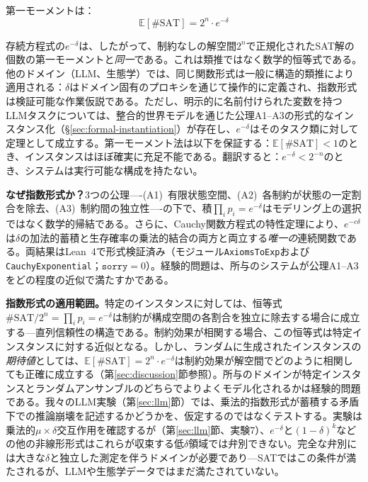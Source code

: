 \documentclass[11pt,a4paper]{article}
\begin{document}
第一モーメントは：
\begin{equation}
\mathbb{E}[\#\text{SAT}] = 2^n \cdot e^{-\delta}
\label{eq:first-moment-exp}
\end{equation}

存続方程式の$e^{-\delta}$は、したがって、制約なしの解空間$2^n$で正規化されたSAT解の個数の第一モーメントと\emph{同一}である。これは類推ではなく数学的恒等式である。他のドメイン（LLM、生態学）では、同じ関数形式は一般に構造的類推により適用される：$\delta$はドメイン固有のプロキシを通じて操作的に定義され、指数形式は検証可能な作業仮説である。ただし、明示的に名前付けられた変数を持つLLMタスクについては、整合的世界モデルを通じた公理A1--A3の形式的なインスタンス化（\S\ref{sec:formal-instantiation}）が存在し、$e^{-\delta}$はそのタスク類に対して定理として成立する。第一モーメント法\cite{alon2016}は以下を保証する：$\mathbb{E}[\#\text{SAT}] < 1$のとき、インスタンスはほぼ確実に充足不能である。翻訳すると：$e^{-\delta} < 2^{-n}$のとき、システムは実行可能な構成を持たない。

\textbf{なぜ指数形式か？}3つの公理----(A1)~有限状態空間、(A2)~各制約が状態の一定割合を除去、(A3)~制約間の独立性----の下で、積$\prod_i p_i = e^{-\delta}$はモデリング上の選択ではなく数学的帰結である。さらに、Cauchy関数方程式の特性定理により、$e^{-c\delta}$は$\delta$の加法的蓄積と生存確率の乗法的結合の両方と両立する\emph{唯一の}連続関数である\cite{aczel1966}。両結果はLean~4で形式検証済み（モジュール\texttt{AxiomsToExp}および\texttt{CauchyExponential}；$\texttt{sorry} = 0$）。経験的問題は、所与のシステムが公理A1--A3をどの程度の近似で満たすかである。

\textbf{指数形式の適用範囲。}特定のインスタンスに対しては、恒等式$\#\text{SAT}/2^n = \prod_i p_i = e^{-\delta}$は制約が構成空間の各割合を独立に除去する場合に成立する---直列信頼性\cite{barlow1975}の構造である。制約効果が相関する場合、この恒等式は特定インスタンスに対する近似となる。しかし、ランダムに生成されたインスタンスの\emph{期待値}としては、$\mathbb{E}[\#\text{SAT}] = 2^n \cdot e^{-\delta}$は制約効果が解空間でどのように相関しても正確に成立する（第\ref{sec:discussion}節参照）。所与のドメインが特定インスタンスとランダムアンサンブルのどちらでよりよくモデル化されるかは経験的問題である。我々のLLM実験（第\ref{sec:llm}節）では、乗法的指数形式が蓄積する矛盾下での推論崩壊を記述するかどうかを、仮定するのではなくテストする。実験は乗法的$\mu \times \delta$交互作用を確認するが（第\ref{sec:llm}節、実験7）、$e^{-\delta}$と$(1-\delta)^k$などの他の非線形形式はこれらが収束する低$\delta$領域では弁別できない。完全な弁別には大きな$\delta$と独立した測定を伴うドメインが必要であり---SATではこの条件が満たされるが、LLMや生態学データではまだ満たされていない。
\end{document}
